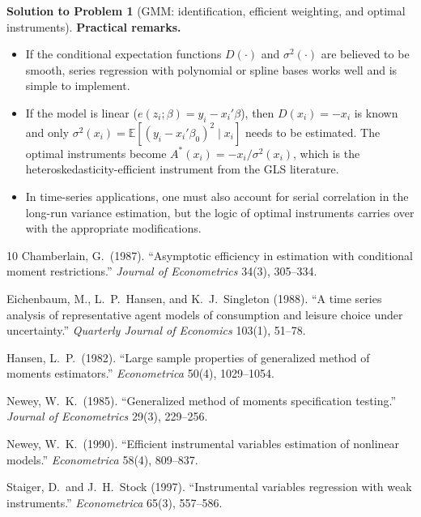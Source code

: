 \documentclass[12pt]{article}
\newcommand{\E}{\mathbb E}
\theoremstyle{definition}
\newtheorem{solution}{Solution to Problem}
\begin{document}
\begin{solution}[GMM: identification, efficient weighting, and optimal instruments]
\medskip
\noindent\textbf{Practical remarks.}
\begin{itemize}
    \item If the conditional expectation functions $D(\cdot)$ and $\sigma^2(\cdot)$ are believed to be smooth, series regression with polynomial or spline bases works well and is simple to implement.
    \item If the model is linear ($e(z_i;\beta)=y_i-x_i'\beta$), then $D(x_i)=-x_i$ is known and only $\sigma^2(x_i)=\E[(y_i-x_i'\beta_0)^2\mid x_i]$ needs to be estimated. The optimal instruments become $A^*(x_i)=-x_i/\sigma^2(x_i)$, which is the heteroskedasticity-efficient instrument from the GLS literature.
    \item In time-series applications, one must also account for serial correlation in the long-run variance estimation, but the logic of optimal instruments carries over with the appropriate modifications.
\end{itemize}

\end{solution}



\vspace{1.5em}
\begin{thebibliography}{10}
Chamberlain, G.\ (1987).
\newblock ``Asymptotic efficiency in estimation with conditional moment restrictions.''
\newblock \emph{Journal of Econometrics} 34(3), 305--334.

Eichenbaum, M., L.\ P.\ Hansen, and K.\ J.\ Singleton (1988).
\newblock ``A time series analysis of representative agent models of consumption and leisure choice under uncertainty.''
\newblock \emph{Quarterly Journal of Economics} 103(1), 51--78.

Hansen, L.\ P.\ (1982).
\newblock ``Large sample properties of generalized method of moments estimators.''
\newblock \emph{Econometrica} 50(4), 1029--1054.

Newey, W.\ K.\ (1985).
\newblock ``Generalized method of moments specification testing.''
\newblock \emph{Journal of Econometrics} 29(3), 229--256.

Newey, W.\ K.\ (1990).
\newblock ``Efficient instrumental variables estimation of nonlinear models.''
\newblock \emph{Econometrica} 58(4), 809--837.

Staiger, D.\ and J.\ H.\ Stock (1997).
\newblock ``Instrumental variables regression with weak instruments.''
\newblock \emph{Econometrica} 65(3), 557--586.
\end{thebibliography}
\end{document}
